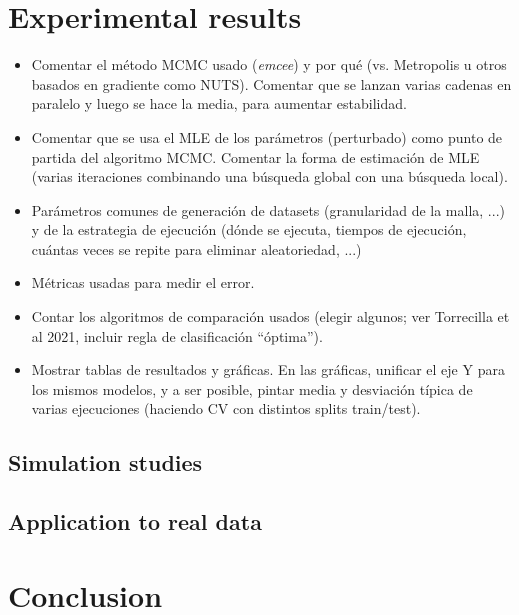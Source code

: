 \documentclass[ba]{imsart}
\numberwithin{equation}{section}
\theoremstyle{plain}
\newenvironment{comment}
{
\noindent \em \color{red}
}
{
\color{black}
}
\begin{document}
\section{Experimental results}\label{sec:results}
\begin{comment}
  \begin{itemize}
    \item Comentar el método MCMC usado (\textit{emcee}) y por qué (vs. Metropolis u otros basados en gradiente como NUTS). Comentar que se lanzan varias cadenas en paralelo y luego se hace la media, para aumentar estabilidad.
    \item Comentar que se usa el MLE de los parámetros (perturbado) como punto de partida del algoritmo MCMC. Comentar la forma de estimación de MLE (varias iteraciones combinando una búsqueda global con una búsqueda local).
    \item Parámetros comunes de generación de datasets (granularidad de la malla, ...) y de la estrategia de ejecución (dónde se ejecuta, tiempos de ejecución, cuántas veces se repite para eliminar aleatoriedad, ...)
    \item Métricas usadas para medir el error.
    \item Contar los algoritmos de comparación usados (elegir algunos; ver Torrecilla et al 2021, incluir regla de clasificación ``óptima'').
    \item Mostrar tablas de resultados y gráficas. En las gráficas, unificar el eje Y para los mismos modelos, y a ser posible, pintar media y desviación típica de varias ejecuciones (haciendo CV con distintos splits train/test).
\end{itemize}
\end{comment}

\subsection{Simulation studies}

\subsection{Application to real data}

\section{Conclusion}\label{sec:conclusion}
\end{document}
